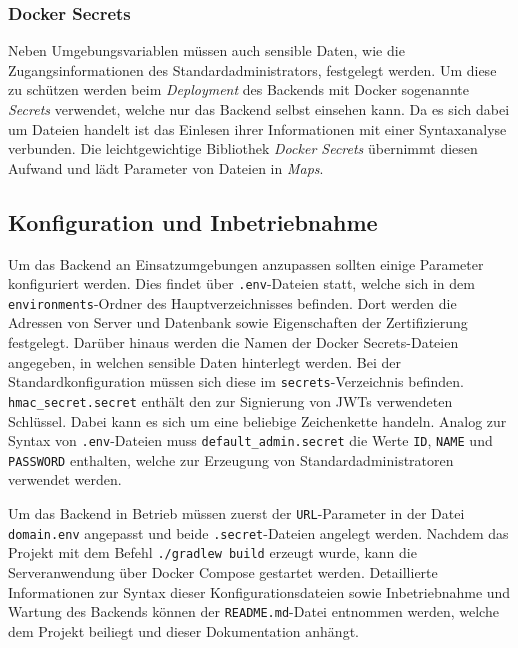 \documentclass[a4paper, 11pt]{article}
\begin{document}
\subsubsection{Docker Secrets}
\label{subsubsec:backend:bibs:dockersecrets}
Neben Umgebungsvariablen müssen auch sensible Daten, wie die Zugangsinformationen des Standardadministrators, festgelegt werden.
Um diese zu schützen werden beim \textit{Deployment} des Backends mit Docker sogenannte \textit{Secrets} verwendet, welche nur das Backend selbst einsehen kann.
Da es sich dabei um Dateien handelt ist das Einlesen ihrer Informationen mit einer Syntaxanalyse verbunden.
Die leichtgewichtige Bibliothek \textit{Docker Secrets} übernimmt diesen Aufwand und lädt Parameter von Dateien in \textit{Maps}.

\subsection{Konfiguration und Inbetriebnahme}
\label{subsec:backend:configuration}
Um das Backend an Einsatzumgebungen anzupassen sollten einige Parameter konfiguriert werden.
Dies findet über \verb|.env|-Dateien statt, welche sich in dem \verb|environments|-Ordner des Hauptverzeichnisses befinden.
Dort werden die Adressen von Server und Datenbank sowie Eigenschaften der Zertifizierung festgelegt.
Darüber hinaus werden die Namen der Docker Secrets-Dateien angegeben, in welchen sensible Daten hinterlegt werden.
Bei der Standardkonfiguration müssen sich diese im \verb|secrets|-Verzeichnis befinden.
\verb|hmac_secret.secret| enthält den zur Signierung von JWTs verwendeten Schlüssel.
Dabei kann es sich um eine beliebige Zeichenkette handeln.
Analog zur Syntax von \verb|.env|-Dateien muss \verb|default_admin.secret| die Werte \verb|ID|, \verb|NAME| und \verb|PASSWORD| enthalten, welche zur Erzeugung von Standardadministratoren verwendet werden.

Um das Backend in Betrieb müssen zuerst der \verb|URL|-Parameter in der Datei \verb|domain.env| angepasst und beide \verb|.secret|-Dateien angelegt werden.
Nachdem das Projekt mit dem Befehl \verb|./gradlew build| erzeugt wurde, kann die Serveranwendung über Docker Compose gestartet werden.
Detaillierte Informationen zur Syntax dieser Konfigurationsdateien sowie Inbetriebnahme und Wartung des Backends können der \verb|README.md|-Datei entnommen werden, welche dem Projekt beiliegt und dieser Dokumentation anhängt.
\end{document}
